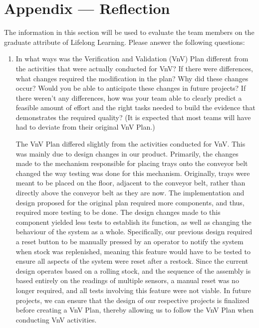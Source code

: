 \documentclass[12pt, titlepage]{article}
\begin{document}
\newpage




\newpage{}
\section*{Appendix --- Reflection}

The information in this section will be used to evaluate the team members on the
graduate attribute of Lifelong Learning.  Please answer the following questions:
\begin{enumerate}
  \item
In what ways was the Verification and Validation (VnV) Plan different
from the activities that were actually conducted for VnV? If there were
differences, what changes required the modification in the plan? Why
did these changes occur? Would you be able to anticipate these changes
in future projects? If there weren’t any differences, how was your team
able to clearly predict a feasible amount of effort and the right tasks
needed to build the evidence that demonstrates the required quality?
(It is expected that most teams will have had to deviate from their
original VnV Plan.)

The VnV Plan differed slightly from the activities conducted for VnV. This was
mainly due to design changes in our product. Primarily, the changes made to the 
mechanism responsible for placing trays onto the conveyor belt changed the way 
testing was done for this mechanism. Originally, trays were meant to be placed 
on the floor, adjacent to the conveyor belt, rather than directly above the conveyor
belt as they are now. The implementation and design proposed for the original plan
required more components, and thus, required more testing to be done. The design changes
made to this component yielded less tests to establish its function, as well as changing 
the behaviour of the system as a whole. Specifically, our previous design required a reset 
button to be manually pressed by an operator to notify the system when stock was replenished, 
meaning this feature would have to be tested to ensure all aspects of the system were reset 
after a restock. Since the current design operates based on a rolling stock, and the sequence 
of the assembly is based entirely on the readings of multiple sensors, a manual reset was no 
longer required, and all tests involving this feature were not viable. In future projects, we 
can ensure that the design of our respective projects is finalized before creating a VnV Plan, 
thereby allowing us to follow the VnV Plan when conducting VnV activities.
\end{enumerate}
\end{document}
